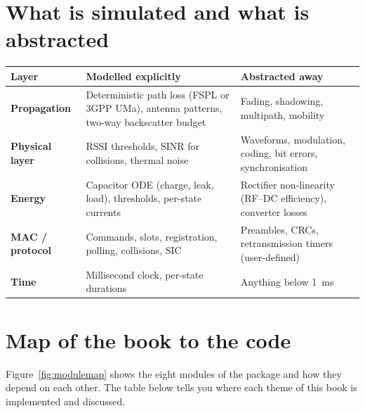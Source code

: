 \section{What is simulated and what is abstracted}

\begin{center}
\small
\renewcommand{\arraystretch}{1.15}
\begin{tabularx}{\linewidth}{@{}>{\sffamily\bfseries}p{3.1cm}XX@{}}
\toprule
Layer & Modelled explicitly & Abstracted away\\
\midrule
Propagation & Deterministic path loss (FSPL or 3GPP UMa), antenna patterns, two-way backscatter budget & Fading, shadowing, multipath, mobility\\
Physical layer & RSSI thresholds, SINR for collisions, thermal noise & Waveforms, modulation, coding, bit errors, synchronisation\\
Energy & Capacitor ODE (charge, leak, load), thresholds, per-state currents & Rectifier non-linearity (RF--DC efficiency), converter losses\\
MAC / protocol & Commands, slots, registration, polling, collisions, SIC & Preambles, CRCs, retransmission timers (user-defined)\\
Time & Millisecond clock, per-state durations & Anything below \SI{1}{ms}\\
\bottomrule
\end{tabularx}
\end{center}

\section{Map of the book to the code}
\label{sec:map}

Figure~\ref{fig:modulemap} shows the eight modules of the  package
and how they depend on each other. The table below tells you where each theme
of this book is implemented and discussed.


